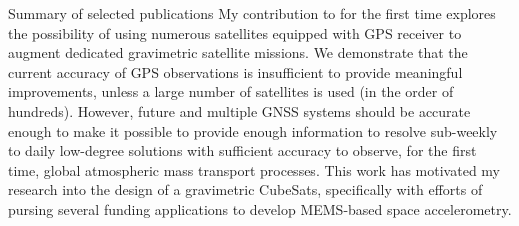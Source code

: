 \begin{cvtext}{Summary of selected publications}
My contribution to \cite{Gunter2011} for the first time explores the possibility of using numerous satellites equipped with \ac{GPS} receiver to augment dedicated gravimetric satellite missions.
We demonstrate that the current accuracy of \ac{GPS} observations is insufficient to provide meaningful improvements, unless a large number of satellites is used (in the order of hundreds).
However, future and multiple \ac{GNSS} systems should be accurate enough to make it possible to provide enough information to resolve sub-weekly to daily low-degree solutions with sufficient accuracy to observe, for the first time, global atmospheric mass transport processes.
This work has motivated my research into the design of a gravimetric CubeSats, specifically with efforts of pursing several funding applications to develop \ac{MEMS}-based space accelerometry.


\vspace{2ex}
\begin{refsection}
\nocite{
TeixeiraEncarnacao2016,
Ditmar2012,
Gunter2011,
}
\togglefalse{bbx:url}
\printbibliography
\end{refsection}

\end{cvtext}